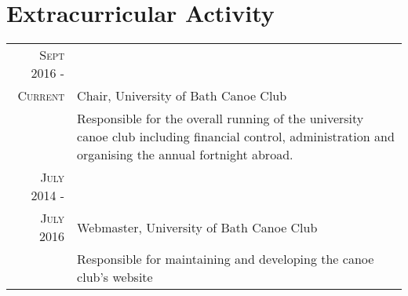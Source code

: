 \documentclass[a4paper,12pt]{article}
\begin{document}
\vspace{1cm}
\section{Extracurricular Activity}
\begin{tabular}{rp{11cm}}
 \textsc{Sept} 2016 -\\ \textsc{Current} & Chair, University of Bath Canoe Club\\& \footnotesize{Responsible for the overall running of the university canoe club including financial control, administration and organising the annual fortnight  abroad.} \\
 \textsc{July} 2014 -\\ \textsc{July} 2016 & Webmaster, University of Bath Canoe Club\\ &\footnotesize{Responsible for maintaining and developing the canoe club's website}
\end{tabular}



\end{document}

